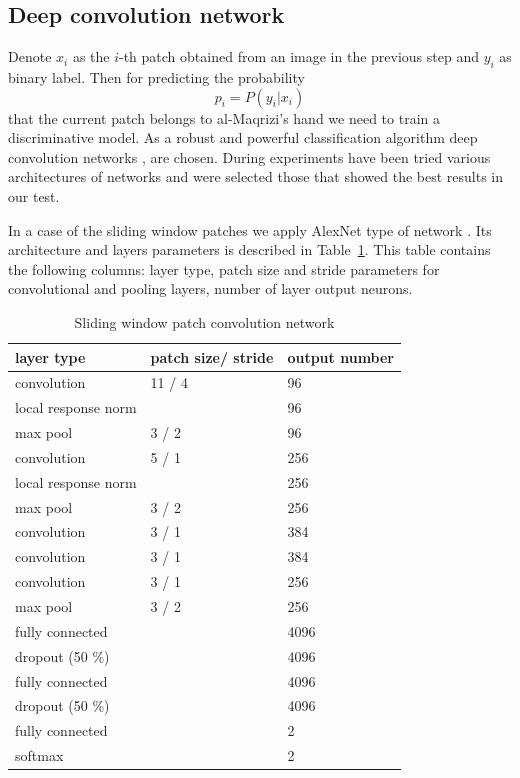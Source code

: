 \documentclass[conference,a4paper]{ieeetran}
\begin{document}
\subsection{Deep convolution network}

Denote $x_i$ as the $i$-th patch obtained from an image in the previous step and $y_i$ as binary label. Then for predicting the probability
\begin{equation*}
	p_i = P(y_i | x_i)
\end{equation*}
that the current patch belongs to al-Maqrizi's hand we need to train a discriminative model. As a robust and powerful classification algorithm deep convolution networks \cite{DL}, \cite{CNN} are chosen. {\color{red} During experiments have been tried various architectures of networks and were selected those that showed the best results in our test.}

In a case of the sliding window patches we apply AlexNet type of network \cite{Alexnet}. Its architecture and layers parameters is described in Table~\ref{alexnet_tab}. This table contains the following columns: layer type, patch size and stride parameters for convolutional and pooling layers, number of layer output neurons.%
\begin{table}[!b]
\centering
\caption{Sliding window patch convolution network}
\label{alexnet_tab}
\begin{tabular}{|l|p{1.3cm}|p{1.3cm}|}
\hline
\textbf{layer type} & \textbf{patch size/ stride} & \textbf{output number}  \\
\hline
convolution & 11 / 4 & 96 \\
\hline
local response norm & & 96 \\
\hline
max pool & 3 / 2 & 96 \\
\hline
convolution & 5 / 1 & 256 \\
\hline
local response norm & & 256 \\
\hline
max pool & 3 / 2 & 256 \\
\hline
convolution & 3 / 1 & 384 \\
\hline
convolution & 3 / 1 & 384 \\
\hline
convolution & 3 / 1 & 256 \\
\hline
max pool & 3 / 2 & 256 \\
\hline
fully connected & & 4096 \\
\hline
dropout (50 \%) & & 4096 \\
\hline
fully connected & & 4096 \\
\hline
dropout (50 \%) & & 4096 \\
\hline
fully connected & & 2 \\
\hline
softmax & & 2 \\
\hline
\end{tabular}
\end{table}
\end{document}
